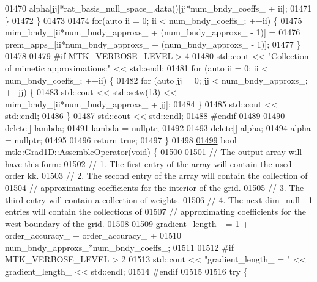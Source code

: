 \begin{DoxyCode}
{{01470         alpha[jj]*rat\_basis\_null\_space\_.data()[jj*num\_bndy\_coeffs\_ + ii];
01471     \}
01472   \}
01473 
01474   \textcolor{keywordflow}{for}(\textcolor{keyword}{auto} ii = 0; ii < num\_bndy\_coeffs\_; ++ii) \{
01475     mim\_bndy\_[ii*num\_bndy\_approxs\_ + (num\_bndy\_approxs\_ - 1)] =
01476       prem\_apps\_[ii*num\_bndy\_approxs\_ + (num\_bndy\_approxs\_ - 1)];
01477   \}
01478 
01479 \textcolor{preprocessor}{  #if MTK\_VERBOSE\_LEVEL > 4}
01480   std::cout << \textcolor{stringliteral}{"Collection of mimetic approximations:"} << std::endl;
01481   \textcolor{keywordflow}{for} (\textcolor{keyword}{auto} ii = 0; ii < num\_bndy\_coeffs\_; ++ii) \{
01482     \textcolor{keywordflow}{for} (\textcolor{keyword}{auto} jj = 0; jj < num\_bndy\_approxs\_; ++jj) \{
01483       std::cout << std::setw(13) << mim\_bndy\_[ii*num\_bndy\_approxs\_ + jj];
01484     \}
01485     std::cout << std::endl;
01486   \}
01487   std::cout << std::endl;
01488 \textcolor{preprocessor}{  #endif}
01489 
01490   \textcolor{keyword}{delete}[] lambda;
01491   lambda = \textcolor{keyword}{nullptr};
01492 
01493   \textcolor{keyword}{delete}[] alpha;
01494   alpha = \textcolor{keyword}{nullptr};
01495 
01496   \textcolor{keywordflow}{return} \textcolor{keyword}{true};
01497 \}
01498 
\hypertarget{mtk__grad__1d_8cc_source_l01499}{}\hyperlink{classmtk_1_1Grad1D_a4eb4d363506b8c64b2bb18a318bbd259}{01499} \textcolor{keywordtype}{bool} \hyperlink{classmtk_1_1Grad1D_a4eb4d363506b8c64b2bb18a318bbd259}{mtk::Grad1D::AssembleOperator}(\textcolor{keywordtype}{void}) \{
01500 
01501   \textcolor{comment}{// The output array will have this form:}
01502   \textcolor{comment}{// 1. The first entry of the array will contain the used order kk.}
01503   \textcolor{comment}{// 2. The second entry of the array will contain the collection of}
01504   \textcolor{comment}{// approximating coefficients for the interior of the grid.}
01505   \textcolor{comment}{// 3. The third entry will contain a collection of weights.}
01506   \textcolor{comment}{// 4. The next dim\_null - 1 entries will contain the collections of}
01507   \textcolor{comment}{// approximating coefficients for the west boundary of the grid.}
01508 
01509   gradient\_length\_ = 1 + order\_accuracy\_ + order\_accuracy\_ +
01510     num\_bndy\_approxs\_*num\_bndy\_coeffs\_;
01511 
01512 \textcolor{preprocessor}{  #if MTK\_VERBOSE\_LEVEL > 2}
01513   std::cout << \textcolor{stringliteral}{"gradient\_length\_ = "} << gradient\_length\_ << std::endl;
01514 \textcolor{preprocessor}{  #endif}
01515 
01516   \textcolor{keywordflow}{try} \{
}}
\end{DoxyCode}
